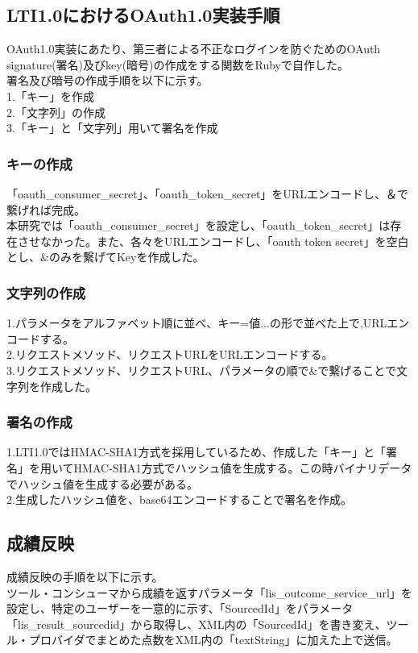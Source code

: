 \subsection{LTI1.0におけるOAuth1.0実装手順}
OAuth1.0実装にあたり、第三者による不正なログインを防ぐためのOAuth signature(署名)及びkey(暗号)の作成をする関数をRubyで自作した。\\
署名及び暗号の作成手順を以下に示す。\\
1.「キー」を作成\\
2.「文字列」の作成\\
3.「キー」と「文字列」用いて署名を作成\\
\subsubsection{キーの作成}
「oauth\_consumer\_secret」、「oauth\_token\_secret」をURLエンコードし、＆で繋げれば完成。\\
本研究では「oauth\_consumer\_secret」を設定し、「oauth\_token\_secret」は存在させなかった。また、各々をURLエンコードし、「oauth token secret」を空白とし、\&のみを繋げてKeyを作成した。
\subsubsection{文字列の作成}
1.パラメータをアルファベット順に並べ、キー=値...の形で並べた上で,URLエンコードする。\\
2.リクエストメソッド、リクエストURLをURLエンコードする。\\
3.リクエストメソッド、リクエストURL、パラメータの順で\&で繋げることで文字列を作成した。\\
\subsubsection{署名の作成}
1.LTI1.0ではHMAC-SHA1方式を採用しているため、作成した「キー」と「署名」を用いてHMAC-SHA1方式でハッシュ値を生成する。この時バイナリデータでハッシュ値を生成する必要がある。\\
2.生成したハッシュ値を、base64エンコードすることで署名を作成。\\
\subsection{成績反映}
成績反映の手順を以下に示す。\\
ツール・コンシューマから成績を返すパラメータ「lis\_outcome\_service\_url」を設定し、特定のユーザーを一意的に示す、「SourcedId」をパラメータ「lis\_result\_sourcedid」から取得し、XML内の「SourcedId」を書き変え、ツール・プロバイダでまとめた点数をXML内の「textString」に加えた上で送信。\\
